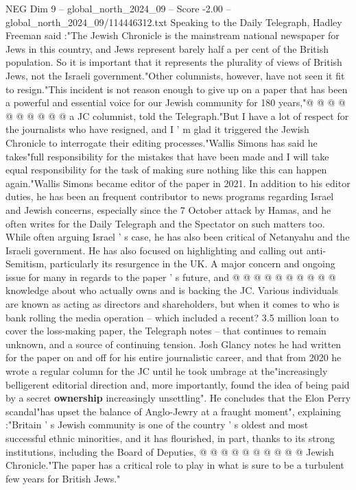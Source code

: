 \begin{textsample}{NEG Dim 9 – global\_north\_2024\_09 – Score -2.00 – global\_north\_2024\_09/114446312.txt}
Speaking to the Daily Telegraph, Hadley Freeman said :"The Jewish Chronicle is the mainstream national newspaper for Jews in this country, and Jews represent barely half a per cent of the British population.
So it is important that it represents the plurality of views of British Jews, not the Israeli government."Other columnists, however, have not seen it fit to resign."This incident is not reason enough to give up on a paper that has been a powerful and essential voice for our Jewish community for 180 years,"@ @ @ @ @ @ @ @ @ @ a JC columnist, told the Telegraph."But I have a lot of respect for the journalists who have resigned, and I ' m glad it triggered the Jewish Chronicle to interrogate their editing processes."Wallis Simons has said he takes"full responsibility for the mistakes that have been made and I will take equal responsibility for the task of making sure nothing like this can happen again."Wallis Simons became editor of the paper in 2021.
In addition to his editor duties, he has been an frequent contributor to news programs regarding Israel and Jewish concerns, especially since the 7 October attack by Hamas, and he often writes for the Daily Telegraph and the Spectator on such matters too.
While often arguing Israel ' s case, he has also been critical of Netanyahu and the Israeli government.
He has also focused on highlighting and calling out anti-Semitism, particularly its resurgence in the UK.
A major concern and ongoing issue for many in regards to the paper ' s future, and @ @ @ @ @ @ @ @ @ @ knowledge about who actually owns and is backing the JC.
Various individuals are known as acting as directors and shareholders, but when it comes to who is bank rolling the media operation -- which included a recent? 3.5 million loan to cover the loss-making paper, the Telegraph notes -- that continues to remain unknown, and a source of continuing tension.
Josh Glancy notes he had written for the paper on and off for his entire journalistic career, and that from 2020 he wrote a regular column for the JC until he took umbrage at the"increasingly belligerent editorial direction and, more importantly, found the idea of being paid by a secret \textbf{ownership} increasingly unsettling".
He concludes that the Elon Perry scandal"has upset the balance of Anglo-Jewry at a fraught moment", explaining :"Britain ' s Jewish community is one of the country ' s oldest and most successful ethnic minorities, and it has flourished, in part, thanks to its strong institutions, including the Board of Deputies, @ @ @ @ @ @ @ @ @ @ Jewish Chronicle."The paper has a critical role to play in what is sure to be a turbulent few years for British Jews."

\end{textsample}
